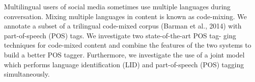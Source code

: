 Multilingual users of social media sometimes use multiple languages during conversation. Mixing multiple languages in content is known as code-mixing. We annotate a subset of a trilingual code-mixed corpus (Barman et al., 2014) with part-of-speech (POS) tags. We investigate two state-of-the-art POS tag- ging techniques for code-mixed content and combine the features of the two systems to build a better POS tagger. Furthermore, we investigate the use of a joint model which performs language identification (LID) and part-of-speech (POS) tagging simultaneously.
